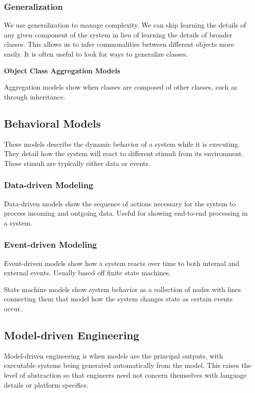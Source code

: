 \documentclass[12pt]{article}
\begin{document}
\subsubsection*{Generalization}

We use generalization to manage complexity. We can skip learning the details of any given component of the system in lieu of learning the details of broader classes. This allows us to infer commonalities between different objects more easily. It is often useful to look for ways to generalize classes.

\textbf{Object Class Aggregation Models}

Aggregation models show when classes are composed of other classes, such as through inheritance.

\subsection*{Behavioral Models}

These models describe the dynamic behavior of a system while it is executing. They detail how the system will react to different stimuli from its environment. These stimuli are typically either data or events.

\subsubsection*{Data-driven Modeling}

Data-driven models show the sequence of actions necessary for the system to process incoming and outgoing data. Useful for showing end-to-end processing in a system.

\subsubsection*{Event-driven Modeling}

Event-driven models show how a system reacts over time to both internal and external events. Usually based off finite state machines.

State machine models show system behavior as a collection of nodes with lines connecting them that model how the system changes state as certain events occur.

\subsection*{Model-driven Engineering}

Model-driven engineering is when models are the principal outputs, with executable systems being generated automatically from the model. This raises the level of abstraction so that engineers need not concern themselves with language details or platform specifics.
\end{document}

